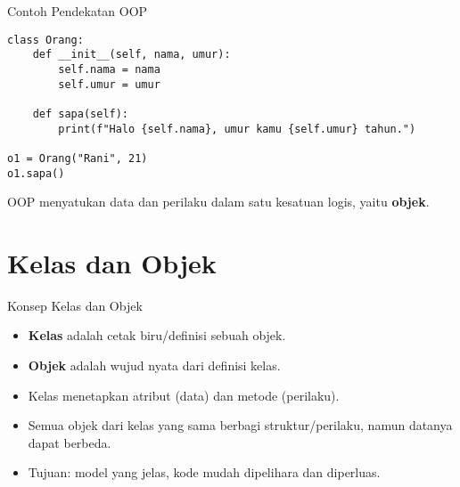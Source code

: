 \documentclass[aspectratio=169, table]{beamer}
\begin{document}
\begin{frame}[fragile]{Contoh Pendekatan OOP}
\vspace{20pt}
\begin{lstlisting}[style=PythonStyle]
class Orang:
    def __init__(self, nama, umur):
        self.nama = nama
        self.umur = umur

    def sapa(self):
        print(f"Halo {self.nama}, umur kamu {self.umur} tahun.")

o1 = Orang("Rani", 21)
o1.sapa()
\end{lstlisting}
OOP menyatukan data dan perilaku dalam satu kesatuan logis, yaitu \textbf{objek}.
\end{frame}

\section{Kelas dan Objek}

\begin{frame}[fragile]{Konsep Kelas dan Objek}
\vspace{20pt}
\begin{itemize}
    \item \textbf{Kelas} adalah cetak biru/definisi sebuah objek.
    \item \textbf{Objek} adalah wujud nyata dari definisi kelas.
    \item Kelas menetapkan atribut (data) dan metode (perilaku).
    \item Semua objek dari kelas yang sama berbagi struktur/perilaku, namun datanya dapat berbeda.
    \item Tujuan: model yang jelas, kode mudah dipelihara dan diperluas.
\end{itemize}
\end{frame}
\end{document}
